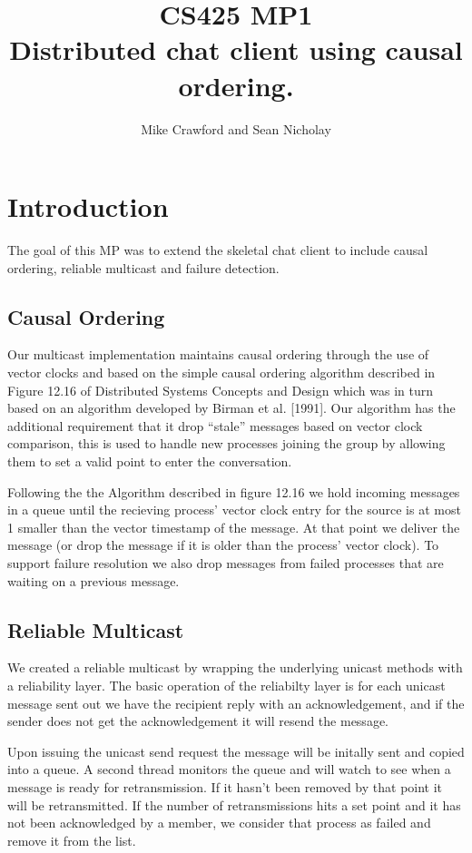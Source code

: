 \documentclass{article}
\begin{document}
\title{CS425 MP1 \\ \large Distributed chat client using causal ordering.}
\author{Mike Crawford and Sean Nicholay}

\maketitle

\section{Introduction}
The goal of this MP was to extend the skeletal chat client to include causal ordering, reliable multicast and failure detection.

\subsection{Causal Ordering}
Our multicast implementation maintains causal ordering through the use of vector clocks and based on the simple causal ordering algorithm described in Figure 12.16 of Distributed Systems Concepts and Design which was in turn based on an algorithm developed by Birman et al. [1991]. Our algorithm has the additional requirement that it drop ``stale'' messages based on vector clock comparison, this is used to handle new processes joining the group by allowing them to set a valid point to enter the conversation.

Following the the Algorithm described in figure 12.16 we hold incoming messages in a queue until the recieving process' vector clock entry for the source is at most 1 smaller than the vector timestamp of the message. At that point we deliver the message (or drop the message if it is older than the process' vector clock). To support failure resolution we also drop messages from failed processes that are waiting on a previous message.

\subsection{Reliable Multicast}
We created a reliable multicast by wrapping the underlying unicast methods with a reliability layer.  The basic operation of the reliabilty layer is for each unicast message sent out we have the recipient reply with an acknowledgement, and if the sender does not get the acknowledgement it will resend the message.

Upon issuing the unicast send request the message will be initally sent and copied into a queue.  A second thread monitors the queue and will watch to see when a message is ready for retransmission.  If it hasn't been removed by that point it will be retransmitted.  If the number of retransmissions hits a set point and it has not been acknowledged by a member, we consider that process as failed and remove it from the list.
\end{document}
